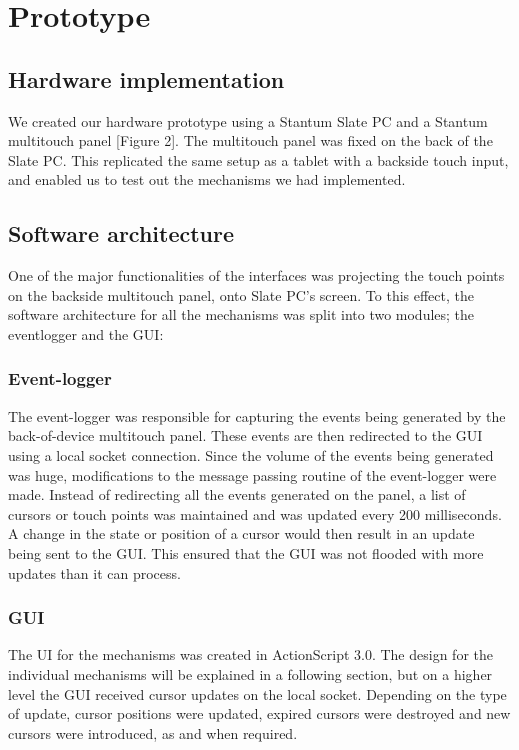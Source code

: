 \section{Prototype}

\subsection{Hardware implementation}

We created our hardware prototype using a Stantum Slate PC and a Stantum multitouch panel [Figure 2]. The multitouch panel was fixed on the back of the Slate PC. This replicated the same setup as a tablet with a backside touch input, and enabled us to test out the mechanisms we had implemented.

\subsection{Software architecture}

One of the major functionalities of the interfaces was projecting the touch points on the backside multitouch panel, onto Slate PC's screen. To this effect, the software architecture for all the mechanisms was split into two modules; the eventlogger and the GUI:

\subsubsection{Event-logger}

The event-logger was responsible for capturing the events being generated by the back-of-device multitouch panel. These events are then redirected to the GUI using a local socket connection. Since the volume of the events being generated was huge, modifications to the message passing routine of the event-logger were made. Instead of redirecting all the events generated on the panel, a list of cursors or touch points was maintained and was updated every 200 milliseconds. A change in the state or position of a cursor would then result in an update being sent to the GUI. This ensured that the GUI was not flooded with more updates than it can process.

\subsubsection{GUI}

The UI for the mechanisms was created in ActionScript 3.0. The design for the individual mechanisms will be explained in a following section, but on a higher level the GUI received cursor updates on the local socket. Depending on the type of update, cursor positions were updated, expired cursors were destroyed and new cursors were introduced, as and when required.
